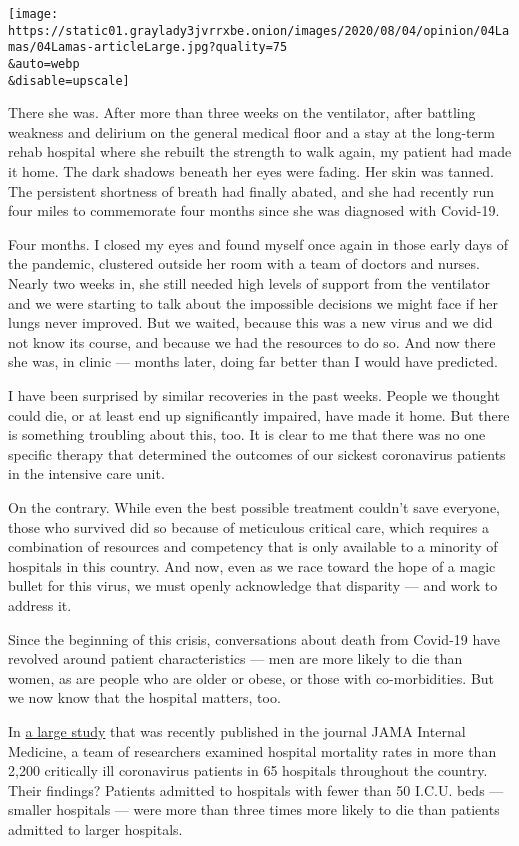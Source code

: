 \texttt{[image: https://static01.graylady3jvrrxbe.onion/images/2020/08/04/opinion/04Lamas/04Lamas-articleLarge.jpg?quality=75\\\&auto=webp\\\&disable=upscale]}

There she was. After more than three weeks on the ventilator, after
battling weakness and delirium on the general medical floor and a stay
at the long-term rehab hospital where she rebuilt the strength to walk
again, my patient had made it home. The dark shadows beneath her eyes
were fading. Her skin was tanned. The persistent shortness of breath had
finally abated, and she had recently run four miles to commemorate four
months since she was diagnosed with Covid-19.

Four months. I closed my eyes and found myself once again in those early
days of the pandemic, clustered outside her room with a team of doctors
and nurses. Nearly two weeks in, she still needed high levels of support
from the ventilator and we were starting to talk about the impossible
decisions we might face if her lungs never improved. But we waited,
because this was a new virus and we did not know its course, and because
we had the resources to do so. And now there she was, in clinic ---
months later, doing far better than I would have predicted.

I have been surprised by similar recoveries in the past weeks. People we
thought could die, or at least end up significantly impaired, have made
it home. But there is something troubling about this, too. It is clear
to me that there was no one specific therapy that determined the
outcomes of our sickest coronavirus patients in the intensive care unit.

On the contrary. While even the best possible treatment couldn't save
everyone, those who survived did so because of meticulous critical care,
which requires a combination of resources and competency that is only
available to a minority of hospitals in this country. And now, even as
we race toward the hope of a magic bullet for this virus, we must openly
acknowledge that disparity --- and work to address it.

Since the beginning of this crisis, conversations about death from
Covid-19 have revolved around patient characteristics --- men are more
likely to die than women, as are people who are older or obese, or those
with co-morbidities. But we now know that the hospital matters, too.

In
\href{https://jamanetwork.com/journals/jamainternalmedicine/fullarticle/2768602}{a
large study} that was recently published in the journal JAMA Internal
Medicine, a team of researchers examined hospital mortality rates in
more than 2,200 critically ill coronavirus patients in 65 hospitals
throughout the country. Their findings? Patients admitted to hospitals
with fewer than 50 I.C.U. beds --- smaller hospitals --- were more than
three times more likely to die than patients admitted to larger
hospitals.

